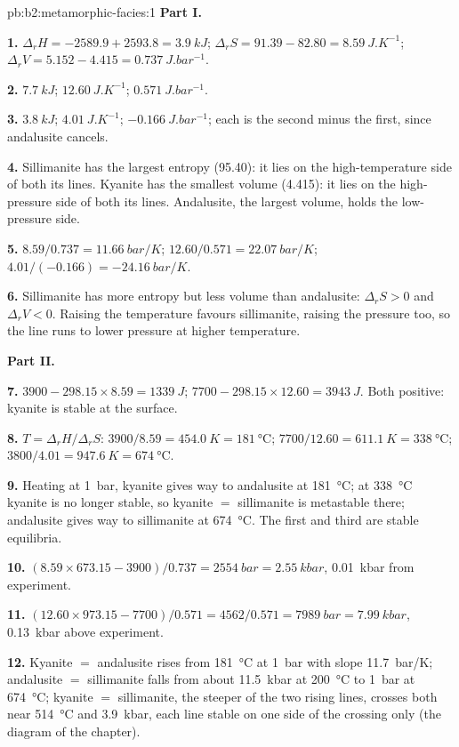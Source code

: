 \begin{solution}{pb:b2:metamorphic-facies:1}
\noindent\textbf{Part I.}

\textbf{1.} $\Delta_r H = -2589.9 + 2593.8 = \qty{3.9}{kJ}$; $\Delta_r S = 91.39 - 82.80 =
\qty{8.59}{J.K^{-1}}$; $\Delta_r V = 5.152 - 4.415 = \qty{0.737}{J.bar^{-1}}$.

\textbf{2.} $\qty{7.7}{kJ}$; $\qty{12.60}{J.K^{-1}}$; $\qty{0.571}{J.bar^{-1}}$.

\textbf{3.} $\qty{3.8}{kJ}$; $\qty{4.01}{J.K^{-1}}$; $\qty{-0.166}{J.bar^{-1}}$; each is
the second minus the first, since andalusite cancels.

\textbf{4.} Sillimanite has the largest entropy (95.40): it lies on the high-temperature
side of both its lines. Kyanite has the smallest volume (4.415): it lies on the
high-pressure side of both its lines. Andalusite, the largest volume, holds the
low-pressure side.

\textbf{5.} $8.59/0.737 = \qty{11.66}{bar/K}$; $12.60/0.571 = \qty{22.07}{bar/K}$;
$4.01/(-0.166) = \qty{-24.16}{bar/K}$.

\textbf{6.} Sillimanite has more entropy but less volume than andalusite: $\Delta_r S > 0$
and $\Delta_r V < 0$. Raising the temperature favours sillimanite, raising the pressure
too, so the line runs to lower pressure at higher temperature.

\noindent\textbf{Part II.}

\textbf{7.} $3900 - 298.15\times8.59 = \qty{+1339}{J}$; $7700 - 298.15\times12.60 =
\qty{+3943}{J}$. Both positive: kyanite is stable at the surface.

\textbf{8.} $T = \Delta_r H/\Delta_r S$: $3900/8.59 = \qty{454.0}{K} = \qty{181}{\celsius}$;
$7700/12.60 = \qty{611.1}{K} = \qty{338}{\celsius}$; $3800/4.01 = \qty{947.6}{K} =
\qty{674}{\celsius}$.

\textbf{9.} Heating at \qty{1}{bar}, kyanite gives way to andalusite at
\qty{181}{\celsius}; at \qty{338}{\celsius} kyanite is no longer stable, so kyanite $=$
sillimanite is metastable there; andalusite gives way to sillimanite at
\qty{674}{\celsius}. The first and third are stable equilibria.

\textbf{10.} $(8.59\times673.15 - 3900)/0.737 = \qty{2554}{bar} = \qty{2.55}{kbar}$,
\qty{0.01}{kbar} from experiment.

\textbf{11.} $(12.60\times973.15 - 7700)/0.571 = 4562/0.571 = \qty{7989}{bar} =
\qty{7.99}{kbar}$, \qty{0.13}{kbar} above experiment.

\textbf{12.} Kyanite $=$ andalusite rises from \qty{181}{\celsius} at \qty{1}{bar} with
slope \qty{11.7}{bar/K}; andalusite $=$ sillimanite falls from about \qty{11.5}{kbar} at
\qty{200}{\celsius} to \qty{1}{bar} at \qty{674}{\celsius}; kyanite $=$ sillimanite, the
steeper of the two rising lines, crosses both near \qty{514}{\celsius} and \qty{3.9}{kbar}, each line stable on
one side of the crossing only (the diagram of the chapter).


\end{solution}
